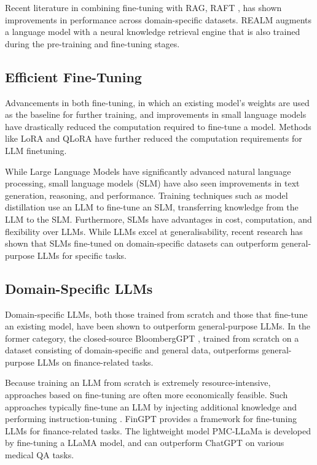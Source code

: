 Recent literature in combining fine-tuning with RAG, RAFT \citep{zhang2024raft},
has shown improvements in performance across domain-specific datasets. REALM
\citep{guu_realm_2020} augments a language model with a neural knowledge
retrieval engine that is also trained during the pre-training and fine-tuning
stages.

\subsection{Efficient Fine-Tuning}

Advancements in both fine-tuning, in which an existing model’s weights are used
as the baseline for further training, and improvements in small language models
have drastically reduced the computation required to fine-tune a model. Methods
like LoRA \citep{hu2021lora} and QLoRA \cite{dettmers2024qlora} have further
reduced the computation requirements for LLM finetuning.

While Large Language Models have significantly advanced natural language
processing, small language models (SLM) have also seen improvements in text
generation, reasoning, and performance. Training techniques such as model
distillation use an LLM to fine-tune an SLM, transferring knowledge from the LLM
to the SLM. Furthermore, SLMs have advantages in cost, computation, and
flexibility over LLMs. While LLMs excel at generalisability, recent research has
shown that SLMs fine-tuned on domain-specific datasets can outperform
general-purpose LLMs for specific tasks.

\subsection{Domain-Specific LLMs}

Domain-specific LLMs, both those trained from scratch and those that fine-tune
an existing model, have been shown to outperform general-purpose LLMs. In the
former category, the closed-source BloombergGPT \citep{wu_bloomberggpt_2023},
trained from scratch on a dataset consisting of domain-specific and general
data, outperforms general-purpose LLMs on finance-related tasks.

Because training an LLM from scratch is extremely resource-intensive, approaches
based on fine-tuning are often more economically feasible. Such approaches
typically fine-tune an LLM by injecting additional knowledge and performing
instruction-tuning \citep{ouyang_training_2022}. FinGPT \citep{yang_fingpt_2023}
provides a framework for fine-tuning LLMs for finance-related tasks. The
lightweight model PMC-LLaMa \citep{wu_pmc-llama_2023} is developed by
fine-tuning a LLaMA model, and can outperform ChatGPT on various medical QA
tasks.
